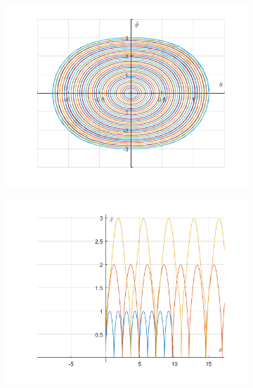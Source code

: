 \documentclass{article}
\begin{document}
	
	\begin{figure}[h!]
	\graphicspath{{./SmallOscillations/S1} }
	\centering
		\begin{subfigure}[b]{0.48\linewidth}
			\includegraphics[width=\linewidth]{./F5.png}
		\end{subfigure}		
		\begin{subfigure}[b]{0.48\linewidth}
			\includegraphics[width=\linewidth]{./F6.png}
		\end{subfigure}
	\end{figure}
	\newpage
	
\end{document}
